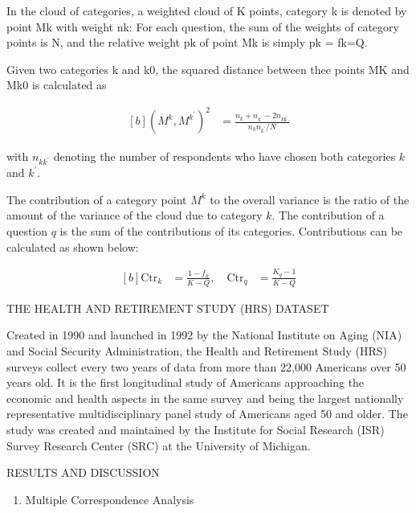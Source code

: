 \documentclass[]{article}
\providecommand{\tightlist}{%
  \setlength{\itemsep}{0pt}\setlength{\parskip}{0pt}}
\begin{document}
In the cloud of categories, a weighted cloud of K points, category k is
denoted by point Mk with weight nk: For each question, the sum of the
weights of category points is N, and the relative weight pk of point Mk
is simply pk = fk=Q.

Given two categories k and k0, the squared distance between thee points
MK and Mk0 is calculated as

\begin{equation}
\begin{aligned}[b]
\label{eq:distCat}
(M^k, M^{k^{\prime}})^2 &= \frac{n_k + n_{k^\prime} - 2 n_{kk^\prime} }{n_k n_{k^\prime}/N}
\end{aligned}
\end{equation}

with \(n_{kk^\prime}\) denoting the number of respondents who have
chosen both categories \(k\) and \(k^\prime.\)

The contribution of a category point \(M^k\) to the overall variance is
the ratio of the amount of the variance of the cloud due to category
\(k\). The contribution of a question \(q\) is the sum of the
contributions of its categories. Contributions can be calculated as
shown below:

\begin{equation}
\begin{aligned}[b]
\label{eq:contribMk}
\text{Ctr}_k &= \frac{1-f_k}{K-Q}, \quad \text{Ctr}_q &= \frac{K_q -1 }{K-Q}
\end{aligned}
\end{equation}

THE HEALTH AND RETIREMENT STUDY (HRS) DATASET

Created in 1990 and launched in 1992 by the National Institute on Aging
(NIA) and Social Security Administration, the Health and Retirement
Study (HRS) surveys collect every two years of data from more than
22,000 Americans over 50 years old. It is the first longitudinal study
of Americans approaching the economic and health aspects in the same
survey and being the largest nationally representative multidisciplinary
panel study of Americans aged 50 and older. The study was created and
maintained by the Institute for Social Research (ISR) Survey Research
Center (SRC) at the University of Michigan.

RESULTS AND DISCUSSION

\begin{enumerate}
\def\labelenumi{\arabic{enumi}.}
\tightlist
\item
  Multiple Correspondence Analysis
\end{enumerate}
\end{document}
